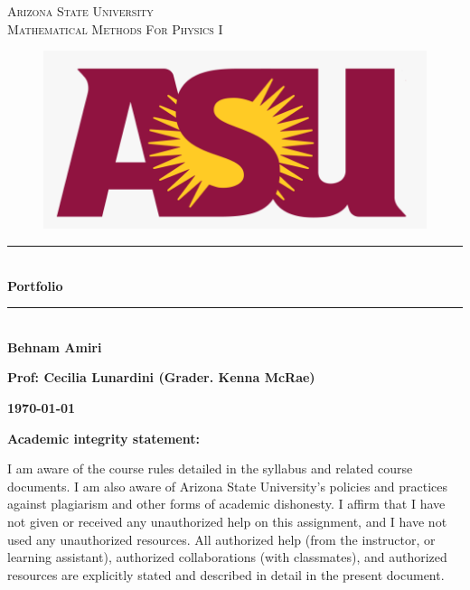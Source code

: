 \documentclass[fleqn]{article}
\begin{document}
\begin{titlepage}

\newcommand{\HRule}{\rule{\linewidth}{0.5mm}} %

\center %
 

\textsc{\LARGE Arizona State University}\\[1.5cm] 

\textsc{\LARGE Mathematical Methods For Physics I }\\[1.5cm]


\begin{figure}
  \includegraphics[width=\linewidth]{asu.png}
\end{figure}


\HRule \\[0.4cm]
{ \huge \bfseries Portfolio}\\[0.4cm] 
\HRule \\[1.5cm]
 
\textbf{Behnam Amiri}

\bigbreak

\textbf{Prof: Cecilia Lunardini (Grader. Kenna McRae)}

\bigbreak


\textbf{{\large \today}\\[2cm]}

\vfill %

\end{titlepage}

\huge \textbf{Academic integrity statement:}

\bigbreak

\Large I am aware of the course rules detailed in the syllabus and related course documents. I am also aware of Arizona State University’s policies and practices against plagiarism and other forms of academic dishonesty. I affirm that I have not given or received any unauthorized help on this assignment, and I have not used any unauthorized resources. All authorized help (from the instructor, or learning assistant), authorized collaborations (with classmates), and authorized resources are explicitly stated and described in detail in the present document.
\end{document}
